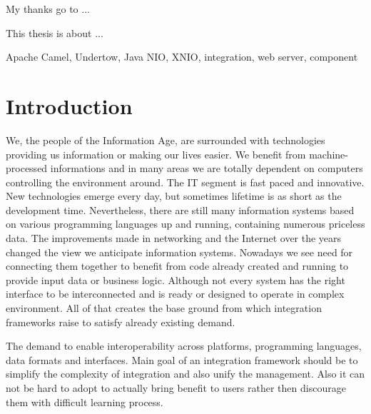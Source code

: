 \documentclass[12pt,final,oneside]{fithesis2}
\begin{document}
\FrontMatter
\ThesisTitlePage

\begin{ThesisDeclaration}
  \DeclarationText
  \AdvisorName
\end{ThesisDeclaration}

\begin{ThesisThanks}
My thanks go to ... 
\end{ThesisThanks}

\begin{ThesisAbstract}
This thesis is about ...
\end{ThesisAbstract}

\begin{ThesisKeyWords}
Apache Camel, Undertow, Java NIO, XNIO, integration, web server, component 
\end{ThesisKeyWords}

\MainMatter

\tableofcontents

\chapter{Introduction}
We, the people of the Information Age, are surrounded with technologies providing us information or making our lives easier. We benefit from machine-processed informations and in many areas we are totally dependent on computers controlling the environment around. The IT segment is fast paced and innovative. New technologies emerge every day, but sometimes lifetime is as short as the development time. Nevertheless, there are still many information systems based on various programming languages up and running, containing numerous priceless data. The improvements made in networking and the Internet over the years changed the view we anticipate information systems. Nowadays we see need for connecting them together to benefit from code already created and running to provide input data or business logic. Although not every system has the right interface to be interconnected and is ready or designed to operate in complex environment. All of that creates the base ground from which integration frameworks raise to satisfy already existing demand.

The demand to enable interoperability across platforms, programming languages, data formats and interfaces. Main goal of an integration framework should be to simplify the complexity of integration and also unify the management. Also it can not be hard to adopt to actually bring benefit to users rather then discourage them with difficult learning process.
\end{document}
